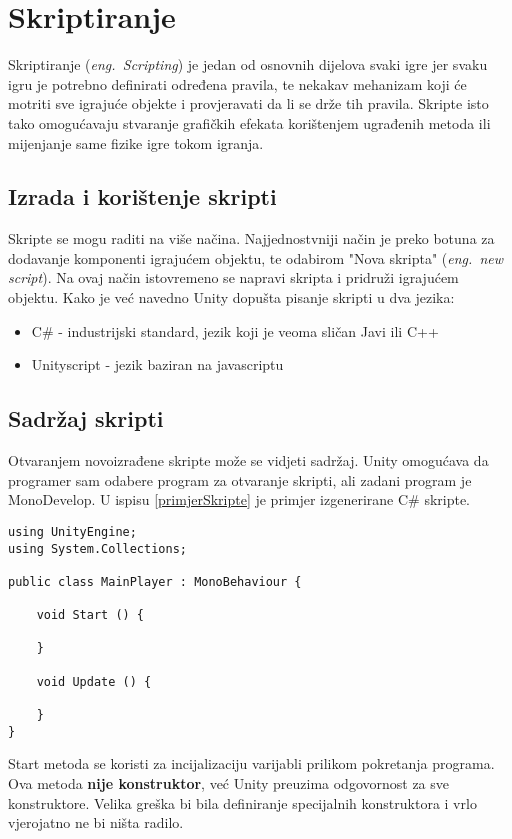 \section{Skriptiranje}
Skriptiranje (\emph{eng.~Scripting}) je jedan od osnovnih dijelova svaki igre jer svaku igru je potrebno definirati određena pravila, te nekakav mehanizam koji će motriti sve igrajuće objekte i provjeravati da li se drže tih pravila. Skripte isto tako omogućavaju stvaranje grafičkih efekata korištenjem ugrađenih metoda ili mijenjanje same fizike igre tokom igranja.
\subsection{Izrada i korištenje skripti}
Skripte se mogu raditi na više načina. Najjednostvniji način je preko botuna za dodavanje komponenti igrajućem objektu, te odabirom "Nova skripta" (\emph{eng.~new script}). Na ovaj način istovremeno se napravi skripta i pridruži igrajućem objektu. Kako je već navedno Unity dopušta pisanje skripti u dva jezika:
\begin{itemize} 
	\item C\# - industrijski standard, jezik koji je veoma sličan Javi ili C++
	\item Unityscript - jezik baziran na javascriptu
\end{itemize}
\subsection{Sadržaj skripti}
Otvaranjem novoizrađene skripte može se vidjeti sadržaj. Unity omogućava da programer sam odabere program za otvaranje skripti, ali zadani program je MonoDevelop. U ispisu \ref{primjerSkripte}  je primjer izgenerirane C\# skripte.

\begin{lstlisting}[caption={Primjer skripte}, label=primjerSkripte]
using UnityEngine;
using System.Collections;

public class MainPlayer : MonoBehaviour {

    void Start () {
    
    }
    
    void Update () {
    
    }
}
\end{lstlisting}
Start metoda se koristi za incijalizaciju varijabli prilikom pokretanja programa. Ova metoda \textbf{nije konstruktor}, već Unity preuzima odgovornost za sve konstruktore. Velika greška bi bila definiranje specijalnih konstruktora i vrlo vjerojatno ne bi ništa radilo.

